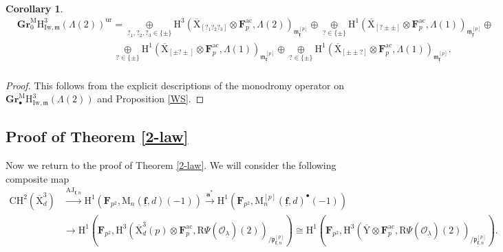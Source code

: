 \documentclass[10pt]{amsart}
\numberwithin{equation}{section}
\theoremstyle{plain}
\newtheorem{corollary}[theorem]{Corollary}
\numberwithin{equation}{section}
\theoremstyle{definition}
\theoremstyle{remark}
\def\AJ{\mathrm{AJ}}
\def\ac{\mathrm{ac}}
\def\frakm{\mathfrak{m}}
\def\ur{\mathrm{ur}}
\def\ac{\mathrm{ac}}
\def\undlamb{\underline{\lambda}}
\def\triplef{\underline{\mathbf{f}}}
\def\calO{\mathcal{O}}
\def\frakm{\mathfrak{m}}
\def\frakp{\mathfrak{p}}
\def\FF{\mathbf{F}}
\def\rmH{\mathrm{H}}
\def\rmM{\mathrm{M}}
\def\rmX{\mathrm{X}}
\def\rmXbar{\overline{\rmX}}
\def\rmY{\mathrm{Y}}
\def\rmR{\mathrm{R}}
\newcommand{\Iw}{\mathrm{Iw}}
\newcommand{\Gr}{\mathbf{Gr}}
\begin{document}
\begin{corollary}
\begin{equation*}
\begin{aligned}
&\Gr^{\rmM}_{0}\rmH^{3}_{\Iw,\frakm}(\Lambda(2))^{\ur}=\underset{?_{1}, ?_{2}, ?_{3}\in\{\pm\}}\oplus\rmH^{3}(\rmXbar_{[?_{1}?_{2}?_{3}]}\otimes{\FF^{\ac}_{p}}, \Lambda(2))_{\frakm^{[p]}_{\triplef}}\oplus \underset{?\in\{\pm\}}\oplus\rmH^{1}(\rmXbar_{[?\pm\pm]}\otimes{\FF^{\ac}_{p}}, \Lambda(1))_{\frakm^{[p]}_{\triplef}}\oplus\\
&\phantom{aaaaaaaaaaaaaaaaaaa}\underset{?\in\{\pm\}}\oplus\rmH^{1}(\rmXbar_{[\pm?\pm]}\otimes{\FF^{\ac}_{p}}, \Lambda(1))_{\frakm^{[p]}_{\triplef}}\oplus\underset{?\in\{\pm\}}\oplus\rmH^{1}(\rmXbar_{[\pm\pm?]}\otimes{\FF^{\ac}_{p}}, \Lambda(1))_{\frakm^{[p]}_{\triplef}}.\\
\end{aligned}
\end{equation*}
\end{corollary}
\begin{proof}
This follows from the explicit descriptions of the monodromy operator on $\Gr^{\rmM}_{\bullet}\rmH^{3}_{\Iw,\frakm}(\Lambda(2))$ and Proposition \ref{WS}.
\end{proof}


\subsection{Proof of Theorem \ref{2-law}} Now we return to the proof of Theorem \ref{2-law}. We will consider the following composite map
\begin{equation*}
\begin{aligned}
\mathrm{CH}^{2}(\overline{\rmX}^{3}_{d})&\xrightarrow{{\AJ}_{\triplef, n}} \rmH^{1}(\FF_{p^{2}}, \rmM_{n}(\triplef, d)(-1))\xrightarrow{\mathbf{a}^{\ast}} \rmH^{1}(\FF_{p^{2}}, \rmM^{[p]}_{n}(\triplef, d)^{\bullet}(-1))\\
&\longrightarrow \rmH^{1}(\FF_{p^{2}}, \rmH^{3}(\overline{\rmX}^{3}_{d}(p)\otimes\FF^{\ac}_{p}, \rmR\Psi(\calO_{\undlamb})(2))_{/\frakp^{[p]}_{\triplef,n}})\cong \rmH^{1}(\FF_{p^{2}}, \rmH^{3}(\overline{\rmY}\otimes\FF^{\ac}_{p}, \rmR\Psi(\calO_{\undlamb})(2))_{/\frakp^{[p]}_{\triplef,n}}).\\
\end{aligned}
\end{equation*}
\end{document}
